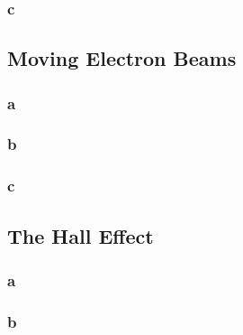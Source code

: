 \subsubsection{c}

\subsection{Moving Electron Beams}
\subsubsection{a}
\subsubsection{b}
\subsubsection{c}

\subsection{The Hall Effect}
\subsubsection{a}
\subsubsection{b}
